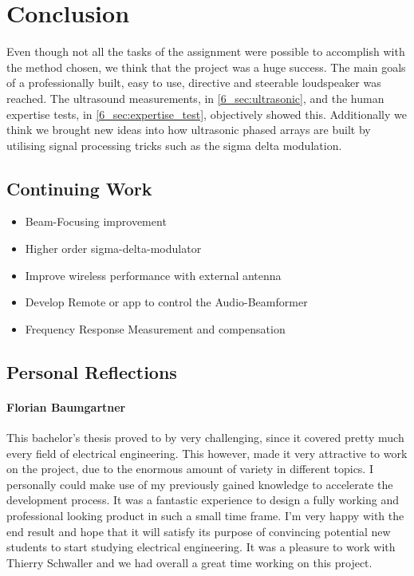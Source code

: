 \chapter{Conclusion}
Even though not all the tasks of the assignment were possible to accomplish with the method chosen, we think that the project was a huge success. The main goals of a professionally built, easy to use, directive and steerable loudspeaker was reached. The ultrasound measurements, in \ref{6_sec:ultrasonic}, and the human expertise tests, in \ref{6_sec:expertise_test}, objectively showed this. Additionally we think we brought new ideas into how ultrasonic phased arrays are built by utilising signal processing tricks such as the sigma delta modulation.     

\section{Continuing Work}

\begin{itemize}
		\item Beam-Focusing improvement
		\item Higher order sigma-delta-modulator
		\item Improve wireless performance with external antenna
		\item Develop Remote or app to control the Audio-Beamformer
		\item Frequency Response Measurement and compensation 
\end{itemize}

\newpage
\section{Personal Reflections}

\subsubsection{Florian Baumgartner}
This bachelor's thesis proved to by very challenging, since it covered pretty much every field of electrical engineering. This however, made it very attractive to work on the project, due to the enormous amount of variety in different topics. I personally could make use of my previously gained knowledge to accelerate the development process. It was a fantastic experience to design a fully working and professional looking product in such a small time frame. I'm very happy with the end result and hope that it will satisfy its purpose of convincing potential new students to start studying electrical engineering. It was a pleasure to work with Thierry Schwaller and we had overall a great time working on this project.

